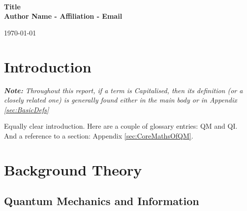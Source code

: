 \documentclass[a4paper,12pt]{article}
\begin{document}
~\\[3.5cm]

\begin{center}

{\huge \bfseries
    Title
}\\[0.5cm]

\textbf{Author Name - Affiliation - Email}\\[2.5cm]


\begin{abstract}
{\it
    Nice abstract.

    With amazingly clear and concise paper description.

    Compilation date at the bottom of the page if required.
}
\end{abstract}

\end{center}


\vfill
\centerline{\large \today}





\newpage
\tableofcontents
\newpage





\section*{Introduction}
\label{sec:Intro}

{\it
\textbf{Note:} Throughout this report, if a term is Capitalised, then its definition (or a closely related one) is
generally found either in the main body or in Appendix \ref{sec:BasicDefs} \\
}

Equally clear introduction.
Here are a couple of glossary entries: \gls{QM} and \gls{QI}.
And a reference to a section: Appendix \ref{sec:CoreMathsOfQM}.


 


\section{Background Theory}
\label{sec:BackgroundTheory}



\subsection{Quantum Mechanics and Information}
\label{sec:SubQMandInfo}
\end{document}
